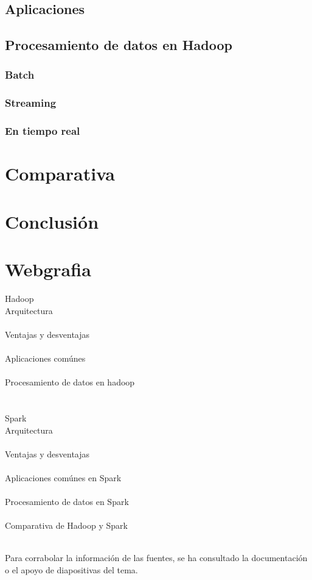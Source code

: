 \documentclass[12pt]{article}
\begin{document}
\subsection{Aplicaciones}

\subsection{Procesamiento de datos en Hadoop}
\subsubsection{Batch}
\subsubsection{Streaming}
\subsubsection{En tiempo real}

\section{Comparativa}

\clearpage

\section{Conclusión}


\clearpage

\section{Webgrafia}


Hadoop
\\
Arquitectura
\\
\cite{aprenderbigdata-hadoop}
\cite{ionos-hadoop}
\\
Ventajas y desventajas
\\
\cite{hostzealot-hadoop}
\cite{jacagudelo-hadoop}
\\
Aplicaciones comúnes
\\
\cite{powerdata-hadoop}
\\
Procesamiento de datos en hadoop
\\
\cite{deusto-hadoop}
\\
\\
Spark
\\
Arquitectura
\\
\cite{keepcoding-spark}
\cite{medium-spark}
\\
Ventajas y desventajas
\\
\cite{bbvaapimarket-spark}
\cite{ionos-spark}
\\
Aplicaciones comúnes en Spark
\\
\cite{googleCloud-spark}
\\
Procesamiento de datos en Spark
\\
\cite{diegocalvo-spark}
\\

Comparativa de Hadoop y Spark
\\
\cite{aws-hadoop-spark}
\cite{esic-hadoop-spark}
\cite{inesdi-hadoop-spark}

\\
Para corrabolar la información de las fuentes, se ha consultado la documentación o el apoyo de diapositivas del tema.
\\
\cite{hadoop-spark}

\printbibliography
\end{document}
